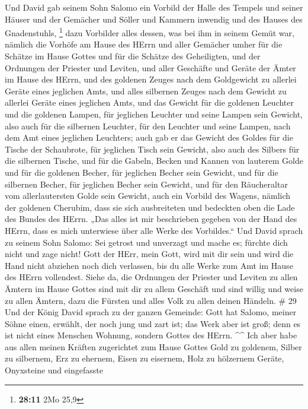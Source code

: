 Und David gab seinem Sohn Salomo ein Vorbild der Halle des Tempels und
seiner Häuser und der Gemächer und Söller und Kammern inwendig und des
Hauses des Gnadenstuhls, \footnote{\textbf{28:11} 2Mo 25,9}
 dazu Vorbilder alles dessen, was bei ihm in seinem Gemüt
war, nämlich die Vorhöfe am Hause des HErrn und aller Gemächer umher für
die Schätze im Hause Gottes und für die Schätze des Geheiligten,
 und der Ordnungen der Priester und Leviten, und aller
Geschäfte und Geräte der Ämter im Hause des HErrn,  und des
goldenen Zeuges nach dem Goldgewicht zu allerlei Geräte eines jeglichen
Amts, und alles silbernen Zeuges nach dem Gewicht zu allerlei Geräte
eines jeglichen Amts,  und das Gewicht für die goldenen
Leuchter und die goldenen Lampen, für jeglichen Leuchter und seine
Lampen sein Gewicht, also auch für die silbernen Leuchter, für den
Leuchter und seine Lampen, nach dem Amt eines jeglichen Leuchters;
 auch gab er das Gewicht des Goldes für die Tische der
Schaubrote, für jeglichen Tisch sein Gewicht, also auch des Silbers für
die silbernen Tische,  und für die Gabeln, Becken und
Kannen von lauterem Golde und für die goldenen Becher, für jeglichen
Becher sein Gewicht, und für die silbernen Becher, für jeglichen Becher
sein Gewicht,  und für den Räucheraltar vom allerlautersten
Golde sein Gewicht, auch ein Vorbild des Wagens, nämlich der goldenen
Cherubim, dass sie sich ausbreiteten und bedeckten oben die Lade des
Bundes des HErrn.  „Das alles ist mir beschrieben gegeben
von der Hand des HErrn, dass es mich unterwiese über alle Werke des
Vorbildes.``  Und David sprach zu seinem Sohn Salomo: Sei
getrost und unverzagt und mache es; fürchte dich nicht und zage nicht!
Gott der HErr, mein Gott, wird mit dir sein und wird die Hand nicht
abziehen noch dich verlassen, bis du alle Werke zum Amt im Hause des
HErrn vollendest.  Siehe da, die Ordnungen der Priester und
Leviten zu allen Ämtern im Hause Gottes sind mit dir zu allem Geschäft
und sind willig und weise zu allen Ämtern, dazu die Fürsten und alles
Volk zu allen deinen Händeln. \# 29  Und der König David
sprach zu der ganzen Gemeinde: Gott hat Salomo, meiner Söhne einen,
erwählt, der noch jung und zart ist; das Werk aber ist groß; denn es ist
nicht eines Menschen Wohnung, sondern Gottes des HErrn. \^{}\^{}
 Ich aber habe aus allen meinen Kräften zugerichtet zum
Hause Gottes Gold zu goldenem, Silber zu silbernem, Erz zu ehernem,
Eisen zu eisernem, Holz zu hölzernem Geräte, Onyxsteine und eingefasste
